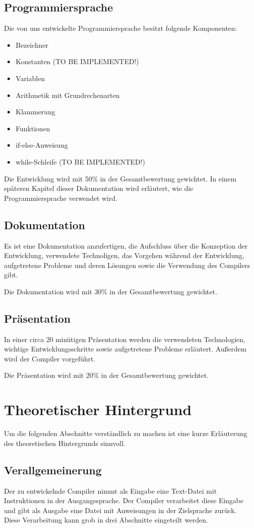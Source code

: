 \documentclass[12pt, a4paper, oneside, ngerman]{article}
\begin{document}
\subsection{Programmiersprache}
Die von uns entwickelte Programmiersprache besitzt folgende Komponenten: 
\begin{itemize}
\item Bezeichner
\item Konstanten (TO BE IMPLEMENTED!)
\item Variablen
\item Arithmetik mit Grundrechenarten
\item Klammerung
\item Funktionen
\item if-else-Anweisung
\item while-Schleife (TO BE IMPLEMENTED!)
\end{itemize}
\noindent
Die Entwicklung wird mit 50\% in der Gesamtbewertung gewichtet.
In einem späteren Kapitel dieser Dokumentation wird erläutert, wie die Programmiersprache verwendet wird.

\subsection{Dokumentation}
Es ist eine Dokumentation anzufertigen, die Aufschluss über die Konzeption der Entwicklung, verwendete Technoligen, das Vorgehen während der Entwicklung, aufgetretene Probleme und deren Lösungen sowie die Verwendung des Compilers gibt.

Die Dokumentation wird mit 30\% in der Gesamtbewertung gewichtet.

\subsection{Präsentation}
In einer circa 20 minütigen Präsentation werden die verwendeten Technologien, wichtige Entwicklungsschritte sowie aufgetretene Probleme erläutert. Außerdem wird der Compiler vorgeführt. 

Die Präsentation wird mit 20\% in der Gesamtbewertung gewichtet.

\pagebreak
\section{Theoretischer Hintergrund}
Um die folgenden Abschnitte verständlich zu machen ist eine kurze Erläuterung des theoretischen Hintergrunds sinnvoll.
\subsection{Verallgemeinerung}
Der zu entwickelnde Compiler nimmt als Eingabe eine Text-Datei mit Instruktionen in der Ausgangssprache. Der Compiler verarbeitet diese Eingabe und gibt als Ausgabe eine Datei mit Anweisungen in der Zielsprache zurück. Diese Verarbeitung kann grob in drei Abschnitte eingeteilt werden.
\end{document}
